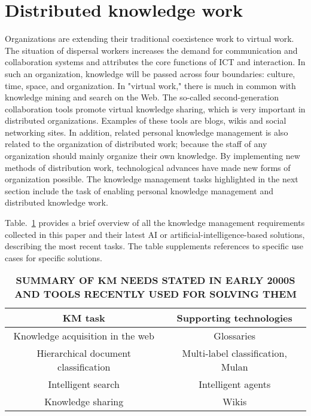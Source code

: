 \documentclass[a4paper,12pt]{article}
\begin{document}
	\section{Distributed knowledge work}
	Organizations are extending their traditional coexistence work to virtual work. The situation of dispersal workers increases the demand for communication and collaboration systems and attributes the core functions of ICT and interaction. In such an organization, knowledge will be passed across four boundaries: culture, time, space, and organization. In "virtual work," there is much in common with knowledge mining and search on the Web. The so-called second-generation collaboration tools promote virtual knowledge sharing, which is very important in distributed organizations. Examples of these tools are blogs, wikis and social networking sites. In addition, related personal knowledge management is also related to the organization of distributed work; because the staff of any organization should mainly organize their own knowledge. By implementing new methods of distribution work, technological advances have made new forms of organization possible. The knowledge management tasks highlighted in the next section include the task of enabling personal knowledge management and distributed knowledge work.
\par 	Table.~\ref{table1} provides a brief overview of all the knowledge management requirements collected in this paper and their latest AI or artificial-intelligence-based solutions, describing the most recent tasks. The table supplements references to specific use cases for specific solutions.
\begin{table}[h]%
	\caption{\bfseries{SUMMARY OF KM NEEDS STATED IN EARLY 2000S AND TOOLS RECENTLY USED FOR SOLVING THEM} }\label{table1}
	
	\begin{tabular}{|c|c|}
		\hline
		KM task & Supporting technologies  \\
		\hline
		Knowledge acquisition in the web   &  Glossaries \\
		\hline
		Hierarchical document classification  &  Multi-label classification, Mulan\cite{Birzniece2011Artificial} \\
		\hline
		Intelligent search   & Intelligent agents \\
		\hline
		Knowledge sharing &Wikis\\
		\hline
	\end{tabular}
\end{table}	
\end{document}
